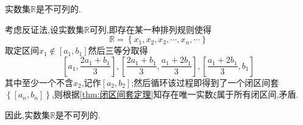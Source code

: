 \begin{formal}
    \begin{theorem}[实数集不可列]\label{thm:实数集不可列}
        实数集$\mathbb{R}$是不可列的.
    \end{theorem}\begin{Proof}
        考虑反证法,设实数集$\mathbb{R}$可列,即存在某一种排列规则使得\[
        \mathbb{R}=\left\{
            x_1,x_2,x_3,\cdots,x_n,\cdots
        \right\}
        \]取定区间$x_1\notin\left[a_1,b_1\right]$然后三等分取得\[
        \left[
            a_1,\frac{2a_1+b_1}{3}
        \right],\left[
            \frac{2a_1+b_1}{3},\frac{a_1+2b_1}{3}
        \right],\left[
            \frac{a_1+2b_1}{3},b_1
        \right]
        \]其中至少一个不含$x_2$,记作$\left[a_2,b_2\right]$;然后循环该过程即得到了一个闭区间套$\displaystyle\left\{\left[a_n,b_n\right]\right\}$,则根据\cref{thm:闭区间套定理}知存在唯一实数$\xi$属于所有闭区间,矛盾.

        因此,实数集$\mathbb{R}$是不可列的.
    \end{Proof}
\end{formal}
